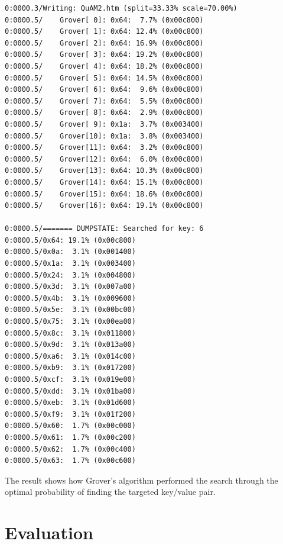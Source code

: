 \documentclass[12pt]{third-rep}
\begin{document}
\begin{verbatim}
0:0000.3/Writing: QuAM2.htm (split=33.33% scale=70.00%)
0:0000.5/    Grover[ 0]: 0x64:  7.7% (0x00c800)
0:0000.5/    Grover[ 1]: 0x64: 12.4% (0x00c800)
0:0000.5/    Grover[ 2]: 0x64: 16.9% (0x00c800)
0:0000.5/    Grover[ 3]: 0x64: 19.2% (0x00c800)
0:0000.5/    Grover[ 4]: 0x64: 18.2% (0x00c800)
0:0000.5/    Grover[ 5]: 0x64: 14.5% (0x00c800)
0:0000.5/    Grover[ 6]: 0x64:  9.6% (0x00c800)
0:0000.5/    Grover[ 7]: 0x64:  5.5% (0x00c800)
0:0000.5/    Grover[ 8]: 0x64:  2.9% (0x00c800)
0:0000.5/    Grover[ 9]: 0x1a:  3.7% (0x003400)
0:0000.5/    Grover[10]: 0x1a:  3.8% (0x003400)
0:0000.5/    Grover[11]: 0x64:  3.2% (0x00c800)
0:0000.5/    Grover[12]: 0x64:  6.0% (0x00c800)
0:0000.5/    Grover[13]: 0x64: 10.3% (0x00c800)
0:0000.5/    Grover[14]: 0x64: 15.1% (0x00c800)
0:0000.5/    Grover[15]: 0x64: 18.6% (0x00c800)
0:0000.5/    Grover[16]: 0x64: 19.1% (0x00c800)

0:0000.5/======= DUMPSTATE: Searched for key: 6
0:0000.5/0x64: 19.1% (0x00c800)
0:0000.5/0x0a:  3.1% (0x001400)
0:0000.5/0x1a:  3.1% (0x003400)
0:0000.5/0x24:  3.1% (0x004800)
0:0000.5/0x3d:  3.1% (0x007a00)
0:0000.5/0x4b:  3.1% (0x009600)
0:0000.5/0x5e:  3.1% (0x00bc00)
0:0000.5/0x75:  3.1% (0x00ea00)
0:0000.5/0x8c:  3.1% (0x011800)
0:0000.5/0x9d:  3.1% (0x013a00)
0:0000.5/0xa6:  3.1% (0x014c00)
0:0000.5/0xb9:  3.1% (0x017200)
0:0000.5/0xcf:  3.1% (0x019e00)
0:0000.5/0xdd:  3.1% (0x01ba00)
0:0000.5/0xeb:  3.1% (0x01d600)
0:0000.5/0xf9:  3.1% (0x01f200)
0:0000.5/0x60:  1.7% (0x00c000)
0:0000.5/0x61:  1.7% (0x00c200)
0:0000.5/0x62:  1.7% (0x00c400)
0:0000.5/0x63:  1.7% (0x00c600)
\end{verbatim}
The result shows how Grover's algorithm performed the search through the optimal probability of finding the targeted key/value pair.


\chapter{Evaluation}
\end{document}
